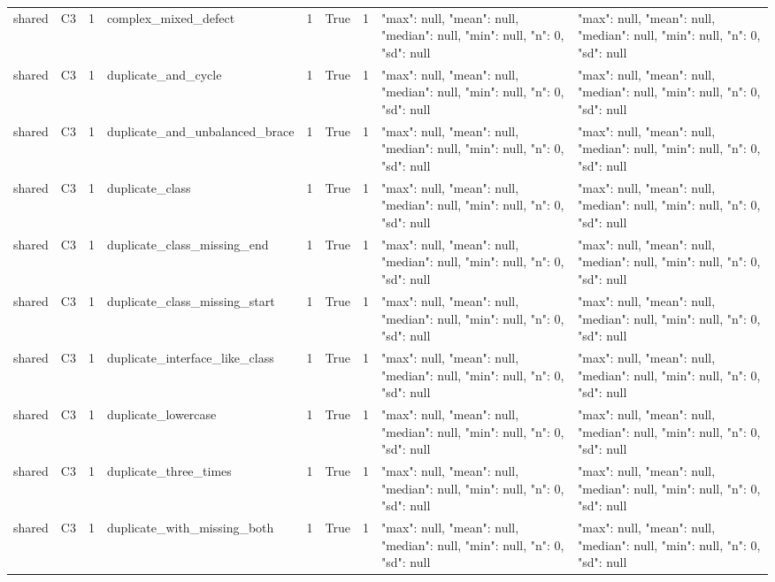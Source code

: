\begin{tabular}{lllllllll}
shared & C3 & 1 & complex\_mixed\_defect & 1 & True & 1 & {"max": null, "mean": null, "median": null, "min": null, "n": 0, "sd": null} & {"max": null, "mean": null, "median": null, "min": null, "n": 0, "sd": null} \\
shared & C3 & 1 & duplicate\_and\_cycle & 1 & True & 1 & {"max": null, "mean": null, "median": null, "min": null, "n": 0, "sd": null} & {"max": null, "mean": null, "median": null, "min": null, "n": 0, "sd": null} \\
shared & C3 & 1 & duplicate\_and\_unbalanced\_brace & 1 & True & 1 & {"max": null, "mean": null, "median": null, "min": null, "n": 0, "sd": null} & {"max": null, "mean": null, "median": null, "min": null, "n": 0, "sd": null} \\
shared & C3 & 1 & duplicate\_class & 1 & True & 1 & {"max": null, "mean": null, "median": null, "min": null, "n": 0, "sd": null} & {"max": null, "mean": null, "median": null, "min": null, "n": 0, "sd": null} \\
shared & C3 & 1 & duplicate\_class\_missing\_end & 1 & True & 1 & {"max": null, "mean": null, "median": null, "min": null, "n": 0, "sd": null} & {"max": null, "mean": null, "median": null, "min": null, "n": 0, "sd": null} \\
shared & C3 & 1 & duplicate\_class\_missing\_start & 1 & True & 1 & {"max": null, "mean": null, "median": null, "min": null, "n": 0, "sd": null} & {"max": null, "mean": null, "median": null, "min": null, "n": 0, "sd": null} \\
shared & C3 & 1 & duplicate\_interface\_like\_class & 1 & True & 1 & {"max": null, "mean": null, "median": null, "min": null, "n": 0, "sd": null} & {"max": null, "mean": null, "median": null, "min": null, "n": 0, "sd": null} \\
shared & C3 & 1 & duplicate\_lowercase & 1 & True & 1 & {"max": null, "mean": null, "median": null, "min": null, "n": 0, "sd": null} & {"max": null, "mean": null, "median": null, "min": null, "n": 0, "sd": null} \\
shared & C3 & 1 & duplicate\_three\_times & 1 & True & 1 & {"max": null, "mean": null, "median": null, "min": null, "n": 0, "sd": null} & {"max": null, "mean": null, "median": null, "min": null, "n": 0, "sd": null} \\
shared & C3 & 1 & duplicate\_with\_missing\_both & 1 & True & 1 & {"max": null, "mean": null, "median": null, "min": null, "n": 0, "sd": null} & {"max": null, "mean": null, "median": null, "min": null, "n": 0, "sd": null} \\

\end{tabular}
